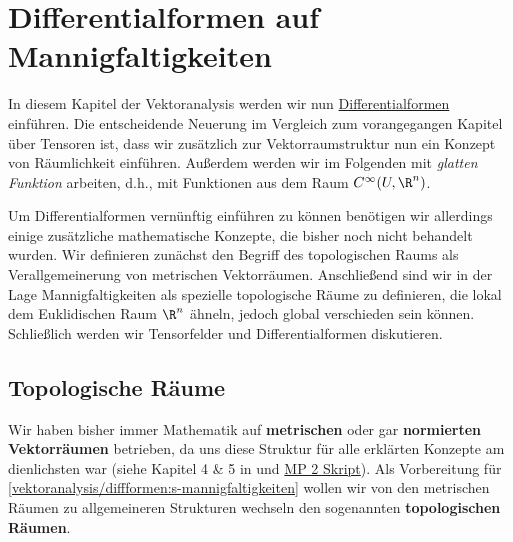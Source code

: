 \documentclass[letterpaper,10pt,english]{jupyterBook}
\begin{document}
\section{Differentialformen auf Mannigfaltigkeiten}
\label{\detokenize{vektoranalysis/diffformen:differentialformen-auf-mannigfaltigkeiten}}\label{\detokenize{vektoranalysis/diffformen::doc}}
\par
In diesem Kapitel der Vektoranalysis werden wir nun \href{https://de.wikipedia.org/wiki/Differentialform}{Differentialformen} einführen.
Die entscheidende Neuerung im Vergleich zum vorangegangen Kapitel über Tensoren ist, dass wir zusätzlich zur Vektorraumstruktur nun ein Konzept von Räumlichkeit einführen.
Außerdem werden wir im Folgenden mit \emph{glatten Funktion} arbeiten, d.h., mit Funktionen aus dem Raum \(C^\infty(U,\R^n)\).

\par
Um Differentialformen vernünftig einführen zu können benötigen wir allerdings einige zusätzliche mathematische Konzepte, die bisher noch nicht behandelt wurden.
Wir definieren zunächst den Begriff des topologischen Raums als Verallgemeinerung von metrischen Vektorräumen.
Anschließend sind wir in der Lage Mannigfaltigkeiten als spezielle topologische Räume zu definieren, die lokal dem Euklidischen Raum \(\R^n\) ähneln, jedoch global verschieden sein können.
Schließlich werden wir Tensorfelder und Differentialformen diskutieren.


\subsection{Topologische Räume}
\label{\detokenize{vektoranalysis/diffformen:topologische-raume}}
\par
Wir haben bisher immer Mathematik auf \textbf{metrischen} oder gar \textbf{normierten Vektorräumen} betrieben, da uns diese Struktur für alle erklärten Konzepte am dienlichsten war (siehe Kapitel 4 \& 5 in \cite{Bur20} und \href{https://fau-ammn.github.io/MathDataScience2/normierte\_raeume/normierte\_raeume.html}{MP 2 Skript}).
Als Vorbereitung für \cref{vektoranalysis/diffformen:s-mannigfaltigkeiten}  wollen wir von den metrischen Räumen zu allgemeineren Strukturen wechseln   den sogenannten \textbf{topologischen Räumen}.
\end{document}
